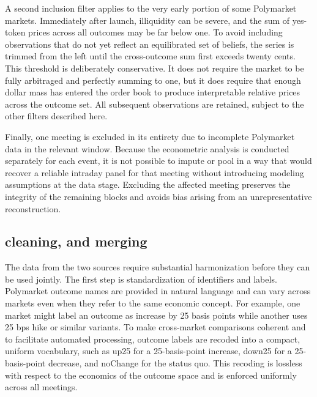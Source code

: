 A second inclusion filter applies to the very early portion of some Polymarket markets. Immediately after launch, illiquidity can be severe, and the sum of yes-token prices across all outcomes may be far below one. To avoid including observations that do not yet reflect an equilibrated set of beliefs, the series is trimmed from the left until the cross-outcome sum first exceeds twenty cents. This threshold is deliberately conservative. It does not require the market to be fully arbitraged and perfectly summing to one, but it does require that enough dollar mass has entered the order book to produce interpretable relative prices across the outcome set. All subsequent observations are retained, subject to the other filters described here.

Finally, one meeting is excluded in its entirety due to incomplete Polymarket data in the relevant window. Because the econometric analysis is conducted separately for each event, it is not possible to impute or pool in a way that would recover a reliable intraday panel for that meeting without introducing modeling assumptions at the data stage. Excluding the affected meeting preserves the integrity of the remaining blocks and avoids bias arising from an unrepresentative reconstruction.

\subsection{cleaning, and merging}

The data from the two sources require substantial harmonization before they can be used jointly. The first step is standardization of identifiers and labels. Polymarket outcome names are provided in natural language and can vary across markets even when they refer to the same economic concept. For example, one market might label an outcome as increase by 25 basis points while another uses 25 bps hike or similar variants. To make cross-market comparisons coherent and to facilitate automated processing, outcome labels are recoded into a compact, uniform vocabulary, such as up25 for a 25-basis-point increase, down25 for a 25-basis-point decrease, and noChange for the status quo. This recoding is lossless with respect to the economics of the outcome space and is enforced uniformly across all meetings.

